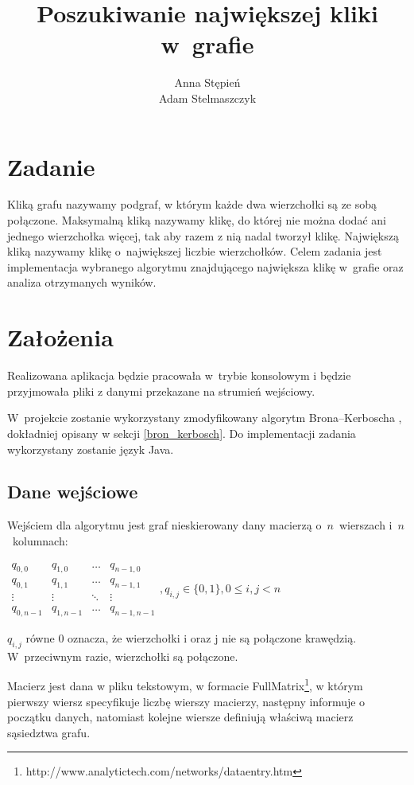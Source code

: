 \documentclass[12pt, a4paper]{article}
\title{\textbf{Poszukiwanie największej kliki w~grafie}}
\author{Anna Stępień \\ Adam Stelmaszczyk}
\date{}
\begin{document}
\maketitle
\tableofcontents

\newpage
\section{Zadanie}

Kliką grafu nazywamy podgraf, w którym każde dwa wierzchołki są ze sobą połączone.
Maksymalną kliką nazywamy klikę, do której nie można dodać ani jednego wierzchołka więcej, tak aby razem z nią nadal tworzył klikę.
Największą kliką nazywamy klikę o~największej liczbie wierzchołków.
Celem zadania jest implementacja wybranego algorytmu znajdującego największa klikę w~grafie oraz analiza otrzymanych wyników.

\section{Założenia}
Realizowana aplikacja będzie pracowała w~trybie konsolowym i będzie przyjmowała pliki z danymi przekazane na strumień wejściowy.

W~projekcie zostanie wykorzystany zmodyfikowany algorytm Brona--Kerboscha \cite{bk}, dokładniej opisany w sekcji \ref{bron_kerbosch}.
Do implementacji zadania wykorzystany zostanie język Java.

\subsection{Dane wejściowe}
Wejściem dla algorytmu jest graf nieskierowany dany macierzą o~$n$~wierszach i~$n$~kolumnach:

\bigskip
$ 
\begin{array}{cccc}
q_{0,0} & q_{1,0} & \ldots & q_{n-1,0} \\
q_{0,1} & q_{1,1} & \ldots & q_{n-1,1} \\
\vdots  & \vdots  & \ddots & \vdots  \\
q_{0,n-1} & q_{1,n-1} & \ldots & q_{n-1,n-1} 
\end{array}
, q_{i,j} \in \{0,1\}, 0 \leq i,j < n
$
\bigskip

$q_{i,j}$ równe 0 oznacza, że wierzchołki i oraz j nie są połączone krawędzią. W~przeciwnym razie, wierzchołki są połączone.
\par\vspace{\baselineskip}
Macierz jest dana w pliku tekstowym, w formacie FullMatrix\footnote{{http://www.analytictech.com/networks/dataentry.htm}}, w którym pierwszy wiersz specyfikuje liczbę wierszy macierzy, następny informuje o początku danych, natomiast kolejne wiersze definiują właściwą macierz sąsiedztwa grafu.
\end{document}
